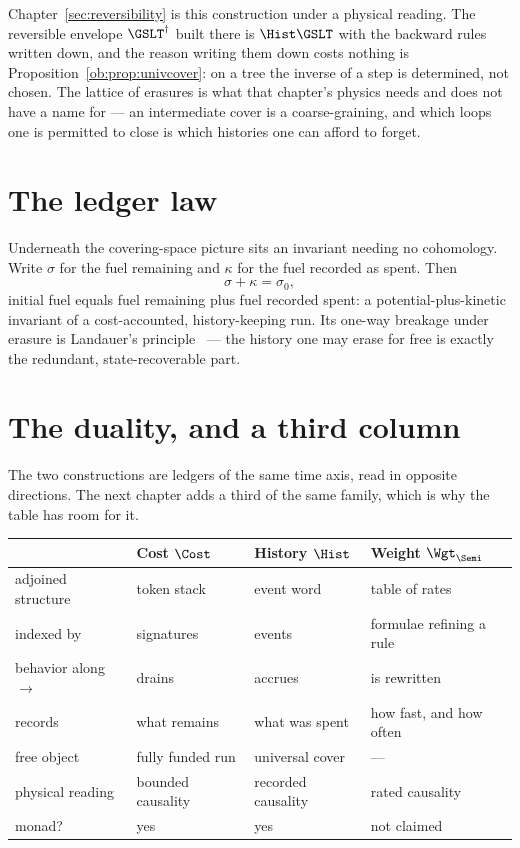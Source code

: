 \begin{remark}
\label{ob:rem:hist-forward}
Chapter~\ref{sec:reversibility} is this construction under a physical reading.
The reversible envelope $\GSLT^\dagger$ built there is $\Hist\GSLT$ with the
backward rules written down, and the reason writing them down costs nothing is
Proposition~\ref{ob:prop:univcover}: on a tree the inverse of a step is
determined, not chosen.
The lattice of erasures is what that chapter's physics needs and does not have a
name for --- an intermediate cover is a coarse-graining, and which loops one is
permitted to close is which histories one can afford to forget.
\end{remark}

\section{The ledger law}

Underneath the covering-space picture sits an invariant needing no cohomology. Write
$\sigma$ for the fuel remaining and $\kappa$ for the fuel recorded as spent. Then
\[
  \sigma + \kappa = \sigma_0 ,
\]
initial fuel equals fuel remaining plus fuel recorded spent: a potential-plus-kinetic
invariant of a cost-accounted, history-keeping run. Its one-way breakage under erasure is
Landauer's principle~\cite{Landauer} --- the history one may erase for free is exactly
the redundant, state-recoverable part.

\section{The duality, and a third column}

The two constructions are ledgers of the same time axis, read in opposite directions. The
next chapter adds a third of the same family, which is why the table has room for it.

\begin{center}
\small
\begin{tabular}{@{}llll@{}}
\toprule
& \textbf{Cost $\Cost$} & \textbf{History $\Hist$} & \textbf{Weight $\Wgt_{\Semi}$} \\
\midrule
adjoined structure & token stack & event word & table of rates \\
indexed by         & signatures & events & formulae refining a rule \\
behavior along $\longrightarrow$ & drains & accrues & is rewritten \\
records            & what remains & what was spent & how fast, and how often \\
free object        & fully funded run & universal cover & --- \\
physical reading   & bounded causality & recorded causality & rated causality \\
monad?             & yes & yes & not claimed \\
\bottomrule
\end{tabular}
\end{center}

